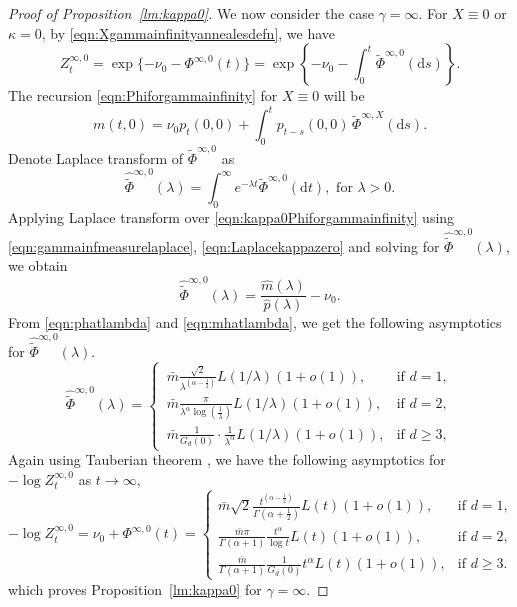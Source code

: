 \documentclass{article}[12pt]
\theoremstyle{definition}
\newcommand{\1}{\mathbbm{1}}
\newcommand{\dd }{\mathrm{d} }
\begin{document}
\begin{proof}[Proof of Proposition~\ref{lm:kappa0}]
We now consider the case $
\gamma = \infty$. For $X\equiv 0$ or $\kappa =0$, by \eqref{eqn:Xgammainfinityannealesdefn}, we have
$$
     Z^{\infty, 0}_t = \exp\{-\nu_0 - \Phi^{\infty,0}(t)\} 
        = \exp\left\{-\nu_0-\int_0^t\tilde{\Phi}^{\infty, 0}(\dd s) \right\}.
$$
The recursion \eqref{eqn:Phiforgammainfinity} for $X\equiv 0$ will be 
\begin{equation}
    m(t,0) = \nu_0 p_{t}(0,0)+  \int_{0}^t p_{t-s}(0,0)\,\tilde{\Phi}^{\infty, X}(\dd s).
\label{eqn:kappa0Phiforgammainfinity}
\end{equation}
Denote Laplace transform of $\tilde{\Phi}^{\infty, 0}$ as
\begin{equation}
\hat{\tilde{\Phi}}^{\infty, 0}(\lambda)= \int_0^\infty  e^{-\lambda t} \tilde{\Phi}^{\infty,0}(\dd t), \text{ for } \lambda>0.
\label{eqn:gammainfmeasurelaplace}
\end{equation} 
Applying Laplace transform over \eqref{eqn:kappa0Phiforgammainfinity} using \eqref{eqn:gammainfmeasurelaplace}, \eqref{eqn:Laplacekappazero} 
and solving for $\hat{\tilde{\Phi}}^{\infty,0}(\lambda)$, we obtain
\begin{equation}
    \hat{\tilde{\Phi}}^{\infty,0}(\lambda) = \frac{\hat{m}(\lambda)}{\hat{p}(\lambda)} - \nu_0.
    \label{eqn:gammainftyPhiHatexpression}
\end{equation}
From \eqref{eqn:phatlambda} and \eqref{eqn:mhatlambda}, we get the following asymptotics for $\hat{\tilde{\Phi}}^{\infty, 0}(\lambda)$.
$$\hat{\tilde{\Phi}}^{\infty, 0}(\lambda) = \begin{cases}
     \, \bar{m}\frac{\sqrt{2}}{\lambda^{(\alpha -\frac{1}{2})}}L(1/\lambda)(1+o(1)), & \text{if } d=1,\\
   \,  \bar{m}\frac{\pi }{\lambda^{\alpha}\log\left(\frac{1}{\lambda}\right)}L(1/\lambda)(1+o(1)), & \text{if } d=2,\\
    \, \bar{m} \frac{1}{G_d(0)}\cdot \frac{1}{\lambda^{\alpha}}L(1/\lambda)(1+o(1)), & \text{if } d\ge 3,
     \end{cases}$$
Again using Tauberian theorem \cite[Chapter~XIII.5, Theorem~2]{F1971}, we have the following asymptotics for $-\log Z^{\infty,0}_t$ as $t\to \infty$,
$$-\log Z^{\infty,0}_t = \nu_0+\Phi^{\infty,0}(t) = \begin{cases}
         \bar{m}\sqrt{2} \frac{t^{(\alpha-\frac{1}{2})}}{\Gamma(\alpha+\frac{1}{2}
        )}L(t)(1+o(1)),& \text{if } d=1,\\
         \frac{\bar{m}\pi}{\Gamma(\alpha + 1)} \frac{t^{\alpha}}{\log t}L(t)(1+o(1)), & \text{if } d=2,\\
         \frac{\bar{m}}{\Gamma(\alpha+1)} \frac{1}{G_d(0)}t^{\alpha}L(t)(1+o(1)), & \text{if } d\ge 3.
         \end{cases}$$
which proves Proposition~\ref{lm:kappa0} for $\gamma = \infty$. 
\end{proof}
\end{document}
